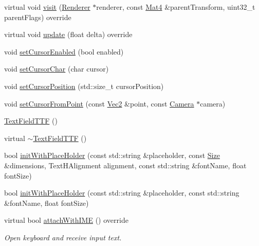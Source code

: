 \begin{DoxyCompactItemize}
\item 
virtual void \hyperlink{classTextFieldTTF_a4e4d61648a15b14774923fc8d2738683}{visit} (\hyperlink{classRenderer}{Renderer} $\ast$renderer, const \hyperlink{classMat4}{Mat4} \&parent\+Transform, uint32\+\_\+t parent\+Flags) override
\item 
virtual void \hyperlink{classTextFieldTTF_a81ad55bca952a4927d3c4acfe8385030}{update} (float delta) override
\item 
void \hyperlink{classTextFieldTTF_a831cdc10f96497cf3909457cc4e2380d}{set\+Cursor\+Enabled} (bool enabled)
\item 
void \hyperlink{classTextFieldTTF_ac638fa956caa6e3a3538b323b71cc23f}{set\+Cursor\+Char} (char cursor)
\item 
void \hyperlink{classTextFieldTTF_abedb3eab1bd2ad1f2ab945ebdde8347b}{set\+Cursor\+Position} (std\+::size\+\_\+t cursor\+Position)
\item 
void \hyperlink{classTextFieldTTF_adf65e756901cf94a0875e4b0c8e8a419}{set\+Cursor\+From\+Point} (const \hyperlink{classVec2}{Vec2} \&point, const \hyperlink{classCamera}{Camera} $\ast$camera)
\item 
\hyperlink{classTextFieldTTF_a1173212d59fdbbaf51d08aff9981a4bb}{Text\+Field\+T\+TF} ()
\item 
virtual \hyperlink{classTextFieldTTF_a08ede52cb83625422a0981ce540d07f3}{$\sim$\+Text\+Field\+T\+TF} ()
\item 
bool \hyperlink{classTextFieldTTF_aec3f818b7717c3355b98f6c9bd4bcc3f}{init\+With\+Place\+Holder} (const std\+::string \&placeholder, const \hyperlink{classSize}{Size} \&dimensions, Text\+H\+Alignment alignment, const std\+::string \&font\+Name, float font\+Size)
\item 
bool \hyperlink{classTextFieldTTF_a03e5755fca447d202d9bd4268a407fac}{init\+With\+Place\+Holder} (const std\+::string \&placeholder, const std\+::string \&font\+Name, float font\+Size)
\item 
\mbox{\label{classTextFieldTTF_a51a6ce33247f93c07676dfe1a4e3dbe9}} 
virtual bool \hyperlink{classTextFieldTTF_a51a6ce33247f93c07676dfe1a4e3dbe9}{attach\+With\+I\+ME} () override
\begin{DoxyCompactList}\small\item\em Open keyboard and receive input text. \end{DoxyCompactList}\item 
\mbox{\label{classTextFieldTTF_a9d003ddd53582cd13e043feb23788f6a}} 

\end{DoxyCompactItemize}
